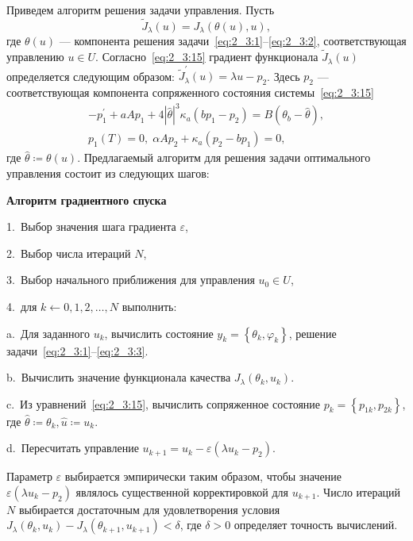 Приведем алгоритм решения задачи управления.
Пусть
\[
    \widetilde{J}_{\lambda}(u)=J_{\lambda}(\theta(u), u),
\]
где $\theta(u)$ — компонента решения
задачи~\eqref{eq:2_3:1}--\eqref{eq:2_3:2},
соответствующая управлению $u \in U$.
Согласно~\eqref{eq:2_3:15} градиент функционала
$\widetilde{J}_{\lambda}(u)$ определяется
следующим образом: $\widetilde{J}_{\lambda}^{\prime}(u) = \lambda u-p_{2}$.
Здесь $p_{2}$ — соответствующая компонента сопряженного
состояния системы~\eqref{eq:2_3:15}
\begin{gather*}
    -p_{1}^{\prime}+a A p_{1}+4|\widehat{\theta}|^{3} \kappa_{a}\left(b p_{1}
    -p_{2}\right)=B\left(\theta_{b}-\widehat{\theta}\right), \\
    p_{1}(T)=0,\; \alpha A p_{2}+\kappa_{a}\left(p_{2}-b p_{1}\right)=0,
\end{gather*}
где $\widehat{\theta}\coloneqq\theta(u)$.
Предлагаемый алгоритм для решения задачи оптимального управления
состоит из следующих шагов:

\textbf{Алгоритм градиентного спуска}

1.\ Выбор значения шага градиента $\varepsilon$,

2.\ Выбор числа итераций $N$,

3.\ Выбор начального приближения для управления $u_{0} \in U$,

4.\ для $k \leftarrow 0,1,2, \ldots, N$ выполнить:

\hspace{1cm} a.\ Для заданного $u_{k}$, вычислить состояние
$y_{k}=\left\{\theta_{k}, \varphi_{k}\right\}$, решение
задачи~\eqref{eq:2_3:1}--\eqref{eq:2_3:3}.

\hspace{1cm} b.\ Вычислить значение функционала качества
$J_{\lambda}\left(\theta_{k}, u_{k}\right)$.

\hspace{1cm} c.\ Из уравнений~\eqref{eq:2_3:15}, вычислить сопряженное
состояние $p_{k}=\left\{p_{1 k}, p_{2 k}\right\}$,
где $\widehat{\theta} \coloneqq \theta_{k}, \widehat{u} \coloneqq u_{k}$.

\hspace{1cm} d.\ Пересчитать управление
$u_{k+1}=u_{k}-\varepsilon\left(\lambda u_{k}-p_{2}\right)$.

Параметр $\varepsilon$ выбирается эмпирически таким образом, чтобы
значение $\varepsilon\left(\lambda u_{k}-p_{2}\right)$ являлось
существенной корректировкой для $u_{k+1}$.
Число итераций $N$ выбирается достаточным для
удовлетворения условия $J_{\lambda}\left(\theta_{k}, u_{k}\right)
-J_{\lambda}\left(\theta_{k+1}, u_{k+1}\right)<\delta$, где $\delta>0$
определяет точность вычислений.

